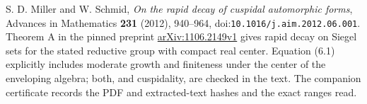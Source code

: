 S. D. Miller and W. Schmid,
\emph{On the rapid decay of cuspidal automorphic forms},
Advances in Mathematics \textbf{231} (2012), 940--964,
doi:\texttt{10.1016/j.aim.2012.06.001}.
Theorem A in the pinned preprint
\href{https://arxiv.org/abs/1106.2149v1}{arXiv:1106.2149v1}
gives rapid decay on Siegel sets for the stated reductive group
with compact real center.  Equation (6.1) explicitly includes
moderate growth and finiteness under the center of the enveloping
algebra; both, and cuspidality, are checked in the text.
The companion certificate records the PDF and extracted-text hashes
and the exact ranges read.
